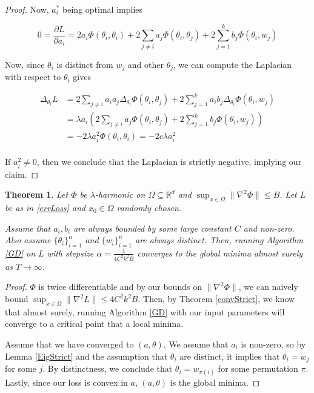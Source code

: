 \documentclass[11pt]{article}
\newtheorem{theorem}{Theorem}[section]
\newcommand{\R}{{\mathbb{R}}}
\newcommand{\pd}[2]{\frac{\partial#1}{\partial#2}}
\begin{document}
\begin{proof}
Now, $a_i^*$ being optimal implies

\begin{equation}
0 = \pd{L}{a_i} = 2a_i \Phi(\theta_i,\theta_i) + 2\sum_{j\neq i} a_j \Phi(\theta_i,\theta_j) + 2\sum_{j=1}^k b_j \Phi(\theta_i,w_j)
\end{equation}

Now, since $\theta_i$ is distinct from $w_j$ and other $\theta_j$, we can compute the Laplacian with respect to $\theta_i$ gives

\begin{align*}
\Delta_{\theta_i}L &= 2\sum_{j\neq i} a_i a_j \Delta_{\theta_i}\Phi(\theta_i,\theta_j) + 2\sum_{j=1}^k a_i b_j \Delta_{\theta_i}\Phi(\theta_i,w_j) \\
&= \lambda a_i\left(2\sum_{j\neq i} a_j \Phi(\theta_i,\theta_j) + 2\sum_{j=1}^k  b_j \Phi(\theta_i,w_j)\right) \\
&= -2\lambda a_i^2\Phi(\theta_i,\theta_i) = -2c \lambda a_i^2\\
\end{align*}

If $a_i^2 \neq 0$, then we conclude that the Laplacian is strictly negative, implying our claim.
\end{proof}



\begin{theorem}\label{eigConvAS}
 Let $\Phi$ be $\lambda$-harmonic on $\Omega \subseteq \R^d$ and $\sup_{x \in \Omega} \|\nabla^2 \Phi\|\leq B$. Let $L$ be as in \eqref{errLoss} and $x_0 \in \Omega$ randomly chosen. 
 
 Assume that $a_i,b_i$ are always bounded by some large constant $C$ and non-zero. Also assume $\{\theta_i\}_{i=1}^n$ and $\{w_i\}_{i=1}^n$ are always distinct. Then, running Algorithm \ref{GD} on $L$ with stepsize $\alpha = \frac{1}{4C^2k^2B}$ converges to the global minima almost surely as $T\to\infty$.
\end{theorem}

\begin{proof}
$\Phi$ is twice differentiable and by our bounds on $\|\nabla^2\Phi\|$, we can naively bound $\sup_{x\in\Omega}\|\nabla^2L\|\leq 4C^2k^2B$. Then, by Theorem \ref{convStrict}, we know that almost surely, running Algorithm \ref{GD} with our input parameters will converge to a critical point that a local minima.

Assume that we have converged to $(a,\theta)$. We assume that $a_i$ is non-zero, so by Lemma \ref{EigStrict} and the assumption that $\theta_i$ are distinct, it implies that  $\theta_i = w_j$ for some $j$. By distinctness, we conclude that $\theta_i = w_{\pi(i)}$ for some permutation $\pi$. Lastly, since our loss is convex in $a$, $(a,\theta)$ is the global minima.
\end{proof}
\end{document}
